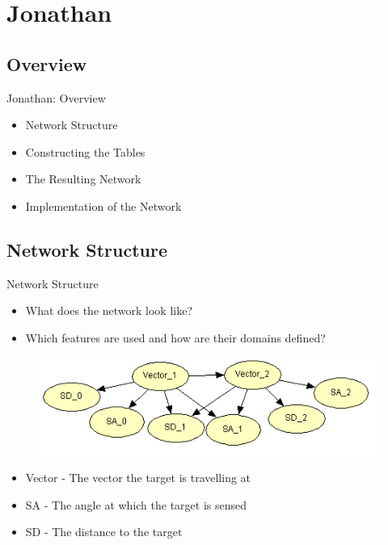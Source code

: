 \section{Jonathan}
\subsection{Overview}
\begin{frame}{Jonathan: Overview}
\begin{itemize}
\item Network Structure
\item Constructing the Tables
\item The Resulting Network
\item Implementation of the Network
\end{itemize}
\end{frame}

\subsection{Network Structure}
\begin{frame}{Network Structure}
\begin{itemize}
\item What does the network look like?
\item Which features are used and how are their domains defined?
\end{itemize}

\begin{figure}
  \includegraphics[scale=0.8]{figures/BNDone.PNG}
\end{figure}

\begin{itemize}
  \item Vector - The vector the target is travelling at
  \item SA - The angle at which the target is sensed
  \item SD - The distance to the target
\end{itemize}
\end{frame}

